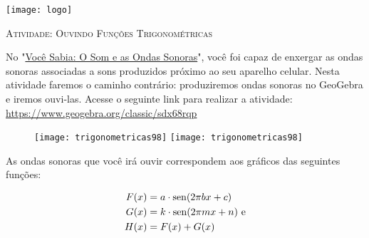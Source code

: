 \documentclass[10 pt,usenames,dvipsnames, oneside]{article}
\begin{document}
\begin{center}
  \begin{minipage}[l]{3cm}
\texttt{[image: logo]}    
\end{minipage}\hfill
\begin{minipage}[r]{.8\textwidth}
 {\Large \scshape Atividade: Ouvindo Funções Trigonométricas}  
\end{minipage}
\end{center}
\vspace{.2cm}








No "\hyperref[trig-knowledge1]{Você Sabia: O Som e as Ondas Sonoras}"{},
você foi capaz de enxergar as ondas sonoras associadas a sons produzidos próximo ao seu aparelho celular. Nesta atividade faremos o caminho contrário: produziremos ondas sonoras no GeoGebra e iremos ouvi-las. Acesse o seguinte link para realizar a atividade: \url{https://www.geogebra.org/classic/sdx68rqp}

\begin{figure}[H]
\centering
\ifdefined\prof
\texttt{[image: trigonometricas98]}
\else
\texttt{[image: trigonometricas98]}
\fi
\end{figure}

As ondas sonoras que você irá ouvir correspondem aos gráficos das seguintes funções:

\begin{align*}
F(x) &= a\cdot\operatorname{sen}(2\pi bx+c)\\
G(x) &= k\cdot\operatorname{sen}(2\pi mx+n) \text{ e}\\
H(x) &= F(x) + G(x)
\end{align*}
\end{document}
